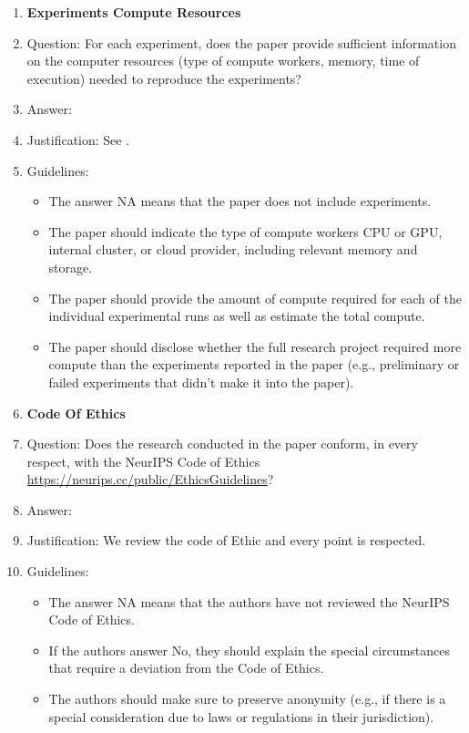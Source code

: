 \documentclass{article}
\begin{document}
\begin{enumerate}
\item {\bf Experiments Compute Resources}
    \item[] Question: For each experiment, does the paper provide sufficient information on the computer resources (type of compute workers, memory, time of execution) needed to reproduce the experiments?
    \item[] Answer: \answerYes{} %
    \item[] Justification: See .
    \item[] Guidelines:
    \begin{itemize}
        \item The answer NA means that the paper does not include experiments.
        \item The paper should indicate the type of compute workers CPU or GPU, internal cluster, or cloud provider, including relevant memory and storage.
        \item The paper should provide the amount of compute required for each of the individual experimental runs as well as estimate the total compute. 
        \item The paper should disclose whether the full research project required more compute than the experiments reported in the paper (e.g., preliminary or failed experiments that didn't make it into the paper). 
    \end{itemize}
    
\item {\bf Code Of Ethics}
    \item[] Question: Does the research conducted in the paper conform, in every respect, with the NeurIPS Code of Ethics \url{https://neurips.cc/public/EthicsGuidelines}?
    \item[] Answer: \answerYes{} %
    \item[] Justification: We review the code of Ethic and every point is respected.
    \item[] Guidelines:
    \begin{itemize}
        \item The answer NA means that the authors have not reviewed the NeurIPS Code of Ethics.
        \item If the authors answer No, they should explain the special circumstances that require a deviation from the Code of Ethics.
        \item The authors should make sure to preserve anonymity (e.g., if there is a special consideration due to laws or regulations in their jurisdiction).
    \end{itemize}



\end{enumerate}
\end{document}
